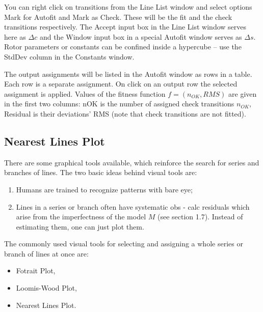 \documentclass[11pt]{article}
\begin{document}

You can right click on transitions from the Line List window and select options Mark for Autofit and Mark as Check. These will be the fit and the check transitions respectively. The Accept input box in the Line List window serves here as $\Delta c$ and the Window input box in a special Autofit window serves as $\Delta s$. Rotor parameters or constants can be confined inside a hypercube -- use the StdDev column in the Constants window.

The output assignments will be listed in the Autofit window as rows in a table. Each row is a separate assignment. On click on an output row the selected assignment is applied. Values of the fitness function $f = (n_{OK}, {RMS})$ are given in the first two columns: nOK is the number of assigned check transitions $n_{OK}$, Residual is their deviations' RMS (note that check transitions are not fitted).


\subsection{Nearest Lines Plot}

There are some graphical tools available, which reinforce the search for series and branches of lines. The two basic ideas behind visual tools are:
\begin{enumerate}
    \item Humans are trained to recognize patterns with bare eye;
    \item Lines in a series or branch often have systematic obs - calc residuals which arise from the imperfectness of the model $M$ (see section 1.7). Instead of estimating them, one can just plot them. 
\end{enumerate}

The commonly used visual tools for selecting and assigning a whole series or branch of lines at once are:
\begin{itemize}
    \item Fotrait Plot,
    \item Loomis-Wood Plot,
    \item Nearest Lines Plot.
\end{itemize}
\end{document}
